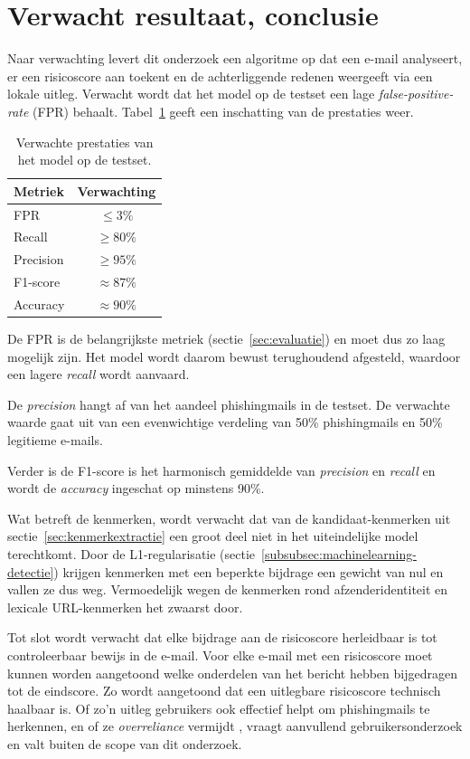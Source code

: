 \section{Verwacht resultaat, conclusie}%
\label{sec:verwachte_resultaten}

Naar verwachting levert dit onderzoek een algoritme op dat een e-mail analyseert, er een risicoscore aan toekent en de achterliggende redenen weergeeft via een lokale uitleg. Verwacht wordt dat het model op de testset een lage \emph{false-positive-rate} (FPR) behaalt. Tabel~\ref{tab:verwachte_resultaten} geeft een inschatting van de  prestaties weer.

\begin{table}[htbp]
  \centering
  \begin{tabular}{lc}
    \toprule
    \textbf{Metriek} & \textbf{Verwachting} \\
    \midrule
    FPR       & $\leqslant 3\%$ \\
    Recall    & $\geqslant 80\%$ \\
    Precision & $\geqslant 95\%$ \\
    F1-score  & $\approx 87\%$ \\
    Accuracy  & $\approx 90\%$ \\
    \bottomrule
  \end{tabular}
  \caption{Verwachte prestaties van het model op de testset.}
  \label{tab:verwachte_resultaten}
\end{table}

De FPR is de belangrijkste metriek (sectie~\ref{sec:evaluatie}) en moet dus zo laag mogelijk zijn. Het model wordt daarom bewust terughoudend afgesteld, waardoor een lagere \emph{recall} wordt aanvaard.

De \emph{precision} hangt af van het aandeel phishingmails in de testset. De verwachte waarde gaat uit van een evenwichtige verdeling van 50\% phishingmails en 50\% legitieme e-mails.

Verder is de F1-score is het harmonisch gemiddelde van \emph{precision} en \emph{recall} en wordt de \emph{accuracy} ingeschat op minstens 90\%.

Wat betreft de kenmerken, wordt verwacht dat van de kandidaat-kenmerken uit sectie~\ref{sec:kenmerkextractie} een groot deel niet in het uiteindelijke model terechtkomt. Door de L1-regularisatie (sectie~\ref{subsubsec:machinelearning-detectie}) krijgen kenmerken met een beperkte bijdrage een gewicht van nul en vallen ze dus weg. Vermoedelijk wegen de kenmerken rond afzenderidentiteit en lexicale URL-kenmerken het zwaarst door.

Tot slot wordt verwacht dat elke bijdrage aan de risicoscore herleidbaar is tot controleerbaar bewijs in de e-mail. Voor elke e-mail met een risicoscore moet kunnen worden aangetoond welke onderdelen van het bericht hebben bijgedragen tot de eindscore. Zo wordt aangetoond dat een uitlegbare risicoscore technisch haalbaar is. Of zo'n uitleg gebruikers ook effectief helpt om phishingmails te herkennen, en of ze \emph{overreliance} vermijdt \autocite{Bucinca2021}, vraagt aanvullend gebruikersonderzoek en valt buiten de scope van dit onderzoek.